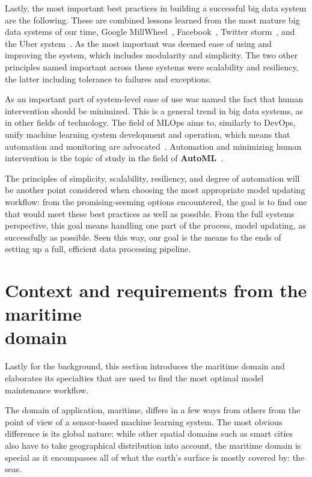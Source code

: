 Lastly, the most important best practices in building a successful big data system are the following. These are combined lessons learned from the most mature big data systems of our time, Google MillWheel~\cite{millwheel}, Facebook~\cite{facebook}, Twitter storm~\cite{storm@twitter}, and the Uber system~\cite{uber}. As the most important was deemed ease of using and improving the system, which includes modularity and simplicity. The two other principles named important across these systems were scalability and resiliency, the latter including tolerance to failures and exceptions. 

\enlargethispage{-7mm}
As an important part of system-level ease of use was named the fact that human intervention should be minimized. This is a general trend in big data systems, as in other fields of technology. The field of MLOps aims to, similarly to DevOps, unify machine learning system development and operation, which means that automation and monitoring are advocated~\cite{googlemlops}. Automation and minimizing human intervention is the topic of study in the field of \textbf{AutoML}~\cite{celikAdaptationStrategiesAutomated2021}.


The principles of simplicity, scalability, resiliency, and degree of automation will be another point considered when choosing the most appropriate model updating workflow: from the promising-seeming options encountered, the goal is to find one that would meet these best practices as well as possible. From the full systems perspective, this goal means handling one part of the process, model updating, as successfully as possible. Seen this way, our goal is the means to the ends of setting up a full, efficient data processing pipeline.

\section[Context and requirements from the maritime domain]{Context and requirements from the maritime\\ domain}

Lastly for the background, this section introduces the maritime domain and elaborates its specialties that are used to find the most optimal model maintenance workflow.

The domain of application, maritime, differs in a few ways from others from the point of view of a sensor-based machine learning system. The most obvious difference is its global nature: while other spatial domains such as smart cities also have to take geographical distribution into account, the maritime domain is special as it encompasses all of what the earth's surface is mostly covered by: the seas. 

